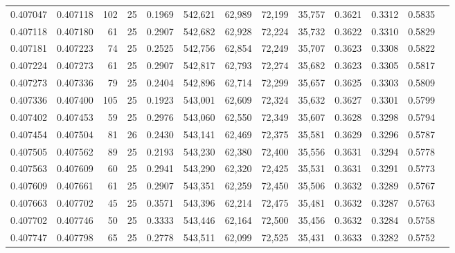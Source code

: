\begin{tabular}{rrrrrrrrrrrrr}
0.407047 & 0.407118 &   102 &  25 &                                     0.1969 & 542,621 &  62,989 &  72,199 &  35,757 & 0.3621 & 0.3312 & 0.5835 \\
0.407118 & 0.407180 &    61 &  25 &                                     0.2907 & 542,682 &  62,928 &  72,224 &  35,732 & 0.3622 & 0.3310 & 0.5829 \\
0.407181 & 0.407223 &    74 &  25 &                                     0.2525 & 542,756 &  62,854 &  72,249 &  35,707 & 0.3623 & 0.3308 & 0.5822 \\
0.407224 & 0.407273 &    61 &  25 &                                     0.2907 & 542,817 &  62,793 &  72,274 &  35,682 & 0.3623 & 0.3305 & 0.5817 \\
0.407273 & 0.407336 &    79 &  25 &                                     0.2404 & 542,896 &  62,714 &  72,299 &  35,657 & 0.3625 & 0.3303 & 0.5809 \\
0.407336 & 0.407400 &   105 &  25 &                                     0.1923 & 543,001 &  62,609 &  72,324 &  35,632 & 0.3627 & 0.3301 & 0.5799 \\
0.407402 & 0.407453 &    59 &  25 &                                     0.2976 & 543,060 &  62,550 &  72,349 &  35,607 & 0.3628 & 0.3298 & 0.5794 \\
0.407454 & 0.407504 &    81 &  26 &                                     0.2430 & 543,141 &  62,469 &  72,375 &  35,581 & 0.3629 & 0.3296 & 0.5787 \\
0.407505 & 0.407562 &    89 &  25 &                                     0.2193 & 543,230 &  62,380 &  72,400 &  35,556 & 0.3631 & 0.3294 & 0.5778 \\
0.407563 & 0.407609 &    60 &  25 &                                     0.2941 & 543,290 &  62,320 &  72,425 &  35,531 & 0.3631 & 0.3291 & 0.5773 \\
0.407609 & 0.407661 &    61 &  25 &                                     0.2907 & 543,351 &  62,259 &  72,450 &  35,506 & 0.3632 & 0.3289 & 0.5767 \\
0.407663 & 0.407702 &    45 &  25 &                                     0.3571 & 543,396 &  62,214 &  72,475 &  35,481 & 0.3632 & 0.3287 & 0.5763 \\
0.407702 & 0.407746 &    50 &  25 &                                     0.3333 & 543,446 &  62,164 &  72,500 &  35,456 & 0.3632 & 0.3284 & 0.5758 \\
0.407747 & 0.407798 &    65 &  25 &                                     0.2778 & 543,511 &  62,099 &  72,525 &  35,431 & 0.3633 & 0.3282 & 0.5752 \\

\end{tabular}
